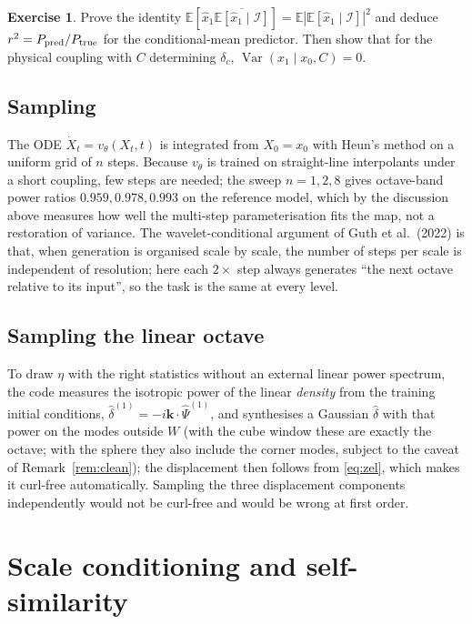 \documentclass[11pt]{article}
\theoremstyle{definition}
\newtheorem{exercise}[proposition]{Exercise}
\newcommand{\kk}{\mathbf{k}}
\newcommand{\E}{\mathbb{E}}
\newcommand{\Var}{\operatorname{Var}}
\begin{document}
\begin{exercise}
Prove the identity $\E[\hat x_1\overline{\E[\hat x_1\mid\mathcal I]}]=\E|\E[\hat x_1\mid\mathcal I]|^2$ and deduce $r^2=P_{\rm pred}/P_{\rm true}$ for the conditional-mean predictor. Then show that for the physical coupling with $C$ determining $\delta_c$, $\Var(x_1\mid x_0,C)=0$.
\end{exercise}

\subsection{Sampling}

The ODE $\dot X_t=v_\theta(X_t,t)$ is integrated from $X_0=x_0$ with Heun's method on a uniform grid of $n$ steps. Because $v_\theta$ is trained on straight-line interpolants under a short coupling, few steps are needed; the sweep $n=1,2,8$ gives octave-band power ratios $0.959,0.978,0.993$ on the reference model, which by the discussion above measures how well the multi-step parameterisation fits the map, not a restoration of variance. The wavelet-conditional argument of Guth et al.\ (2022) is that, when generation is organised scale by scale, the number of steps per scale is independent of resolution; here each $2\times$ step always generates ``the next octave relative to its input'', so the task is the same at every level.

\subsection{Sampling the linear octave}

To draw $\eta$ with the right statistics without an external linear power spectrum, the code measures the isotropic power of the linear \emph{density} from the training initial conditions, $\hat\delta^{(1)}=-i\kk\cdot\hat\Psi^{(1)}$, and synthesises a Gaussian $\hat\delta$ with that power on the modes outside $W$ (with the cube window these are exactly the octave; with the sphere they also include the corner modes, subject to the caveat of Remark~\ref{rem:clean}); the displacement then follows from \eqref{eq:zel}, which makes it curl-free automatically. Sampling the three displacement components independently would not be curl-free and would be wrong at first order.

\section{Scale conditioning and self-similarity}\label{sec:ss}
\end{document}

